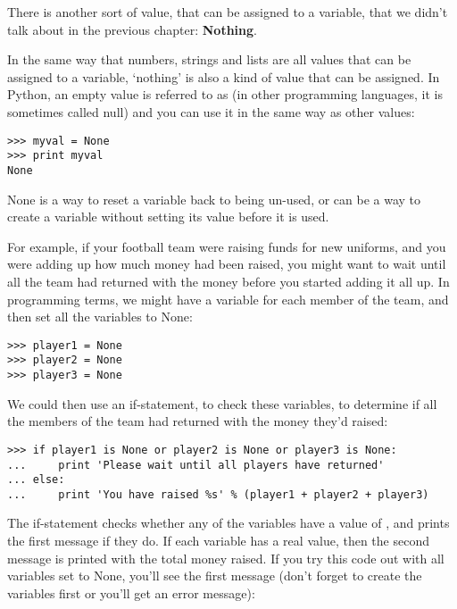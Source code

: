 There is another sort of value, that can be assigned to a variable, that we didn't talk about in the previous chapter:  \textbf{Nothing}.
\par
In the same way that numbers, strings and lists are all values that can be assigned to a variable, `nothing' is also a kind of value that can be assigned.  In Python, an empty value is referred to as  (in other programming languages, it is sometimes called null) and you can use it in the same way as other values:

\begin{listing}
\begin{verbatim}
>>> myval = None
>>> print myval
None
\end{verbatim}
\end{listing}

None is a way to reset a variable back to being un-used, or can be a way to create a variable without setting its value before it is used.
\par
For example, if your football team were raising funds for new uniforms, and you were adding up how much money had been raised, you might want to wait until all the team had returned with the money before you started adding it all up.  In programming terms, we might have a variable for each member of the team, and then set all the variables to None:

\begin{listing}
\begin{verbatim}
>>> player1 = None
>>> player2 = None
>>> player3 = None
\end{verbatim}
\end{listing}

We could then use an if-statement, to check these variables, to determine if all the members of the team had returned with the money they'd raised:

\begin{listing}
\begin{verbatim}
>>> if player1 is None or player2 is None or player3 is None:
...     print 'Please wait until all players have returned'
... else:
...     print 'You have raised %s' % (player1 + player2 + player3)
\end{verbatim}
\end{listing}

The if-statement checks whether any of the variables have a value of , and prints the first message if they do.  If each variable has a real value, then the second message is printed with the total money raised. If you try this code out with all variables set to None, you'll see the first message (don't forget to create the variables first or you'll get an error message):

